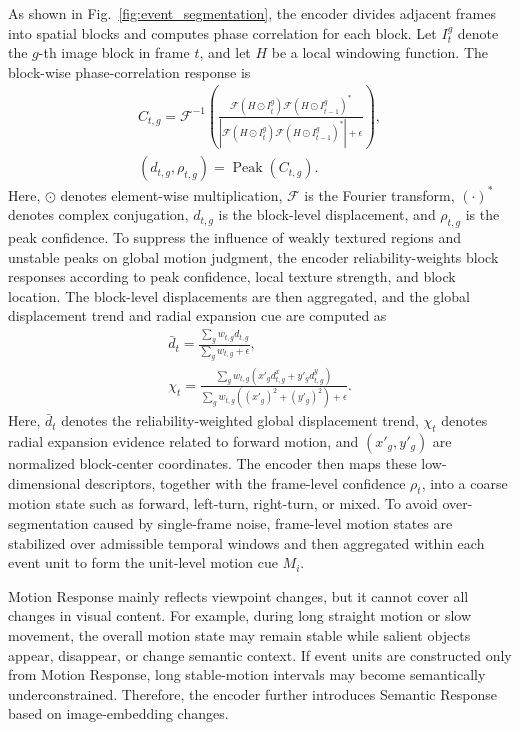 \documentclass[journal]{IEEEtran}
\begin{document}
As shown in Fig.~\ref{fig:event_segmentation}, the encoder divides adjacent frames into spatial blocks and computes phase correlation for each block. Let \(I_t^g\) denote the \(g\)-th image block in frame \(t\), and let \(H\) be a local windowing function. The block-wise phase-correlation response is
\begin{equation}
\begin{gathered}
C_{t,g}=
\mathcal{F}^{-1}\!\left(
\frac{
\mathcal{F}(H\odot I_t^g)
\mathcal{F}(H\odot I_{t-1}^g)^{\ast}
}{
\left|
\mathcal{F}(H\odot I_t^g)
\mathcal{F}(H\odot I_{t-1}^g)^{\ast}
\right|+\epsilon
}
\right),\\
(d_{t,g},\rho_{t,g})=\operatorname{Peak}(C_{t,g}).
\end{gathered}
\label{eq:block_phase_correlation}
\end{equation}
Here, \(\odot\) denotes element-wise multiplication, \(\mathcal{F}\) is the Fourier transform, \((\cdot)^\ast\) denotes complex conjugation, \(d_{t,g}\) is the block-level displacement, and \(\rho_{t,g}\) is the peak confidence. To suppress the influence of weakly textured regions and unstable peaks on global motion judgment, the encoder reliability-weights block responses according to peak confidence, local texture strength, and block location. The block-level displacements are then aggregated, and the global displacement trend and radial expansion cue are computed as
\begin{equation}
\begin{gathered}
\bar{d}_t=
\frac{\sum_g w_{t,g}d_{t,g}}
{\sum_g w_{t,g}+\epsilon},\\
\chi_t=
\frac{
\sum_g w_{t,g}\left(x'_g d^x_{t,g}+y'_g d^y_{t,g}\right)}
{\sum_g w_{t,g}\left((x'_g)^2+(y'_g)^2\right)+\epsilon}.
\end{gathered}
\label{eq:motion_descriptors}
\end{equation}
Here, \(\bar{d}_t\) denotes the reliability-weighted global displacement trend, \(\chi_t\) denotes radial expansion evidence related to forward motion, and \((x'_g,y'_g)\) are normalized block-center coordinates. The encoder then maps these low-dimensional descriptors, together with the frame-level confidence \(\rho_t\), into a coarse motion state such as forward, left-turn, right-turn, or mixed. To avoid over-segmentation caused by single-frame noise, frame-level motion states are stabilized over admissible temporal windows and then aggregated within each event unit to form the unit-level motion cue \(M_i\).

Motion Response mainly reflects viewpoint changes, but it cannot cover all changes in visual content. For example, during long straight motion or slow movement, the overall motion state may remain stable while salient objects appear, disappear, or change semantic context. If event units are constructed only from Motion Response, long stable-motion intervals may become semantically underconstrained. Therefore, the encoder further introduces Semantic Response based on image-embedding changes.
\end{document}

